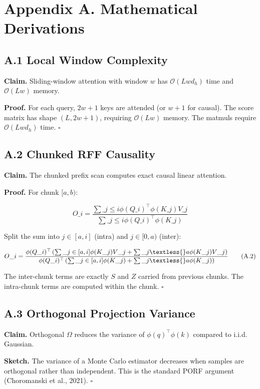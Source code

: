 
\section{Appendix A. Mathematical Derivations}

\subsection{A.1 Local Window Complexity}

\textbf{Claim.} Sliding-window attention with window $w$ has $\mathcal{O}(L w d_h)$ 
time and $\mathcal{O}(L w)$ memory.

\textbf{Proof.} For each query, $2w + 1$ keys are attended (or $w + 1$ for causal). 
The score matrix has shape $(L, 2w+1)$, requiring $\mathcal{O}(L w)$ memory. 
The matmuls require $\mathcal{O}(L w d_h)$ time. $\square$

\subsection{A.2 Chunked RFF Causality}

\textbf{Claim.} The chunked prefix scan computes exact causal linear attention.

\textbf{Proof.} For chunk $[a, b)$:

\[
O\_i = \frac{\sum\_{j \le i} \phi(Q\_i)^\top \phi(K\_j) V\_j}{\sum\_{j \le i} \phi(Q\_i)^\top \phi(K\_j)}
\tag{A.1}
\]

Split the sum into $j \in [a, i]$ (intra) and $j \in [0, a)$ (inter):

\[
O\_i = \frac{\phi(Q\_i)^\top \left(\sum\_{j \in [a, i]} \phi(K\_j) V\_j + \sum\_{j \textless{} a} \phi(K\_j) V\_j\right)}{\phi(Q\_i)^\top \left(\sum\_{j \in [a, i]} \phi(K\_j) + \sum\_{j \textless{} a} \phi(K\_j)\right)}
\tag{A.2}
\]

The inter-chunk terms are exactly $S$ and $Z$ carried from previous chunks. 
The intra-chunk terms are computed within the chunk. $\square$

\subsection{A.3 Orthogonal Projection Variance}

\textbf{Claim.} Orthogonal $\Omega$ reduces the variance of $\phi(q)^\top \phi(k)$ 
compared to i.i.d. Gaussian.

\textbf{Sketch.} The variance of a Monte Carlo estimator decreases when samples 
are orthogonal rather than independent. This is the standard PORF argument 
(Choromanski et al., 2021). $\square$

